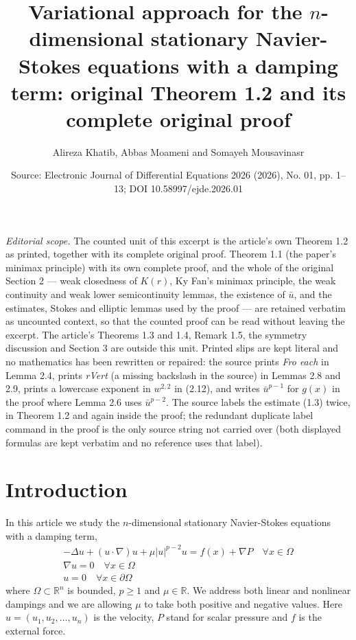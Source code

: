\documentclass[10pt,a4paper]{amsart}
\title[Stationary Navier-Stokes with nonlinear damping: original Theorem 1.2]{Variational approach for the $n$-dimensional stationary Navier-Stokes equations with a damping term: original Theorem 1.2 and its complete original proof}
\author{Alireza Khatib, Abbas Moameni and Somayeh Mousavinasr}
\date{Source: Electronic Journal of Differential Equations 2026 (2026), No. 01, pp. 1--13; DOI 10.58997/ejde.2026.01}
\numberwithin{equation}{section}
\begin{document}
\maketitle
\noindent\textit{Editorial scope.} The counted unit of this excerpt is the article's own Theorem 1.2 as printed, together with its complete original proof. Theorem 1.1 (the paper's minimax principle) with its own complete proof, and the whole of the original Section 2 --- weak closedness of $K(r)$, Ky Fan's minimax principle, the weak continuity and weak lower semicontinuity lemmas, the existence of $\bar u$, and the estimates, Stokes and elliptic lemmas used by the proof --- are retained verbatim as uncounted context, so that the counted proof can be read without leaving the excerpt. The article's Theorems 1.3 and 1.4, Remark 1.5, the symmetry discussion and Section 3 are outside this unit. Printed slips are kept literal and no mathematics has been rewritten or repaired: the source prints \textit{Fro each} in Lemma 2.4, prints \textit{rVert} (a missing backslash in the source) in Lemmas 2.8 and 2.9, prints a lowercase exponent in $w^{2,2}$ in (2.12), and writes $\bar u^{p-1}$ for $g(x)$ in the proof where Lemma 2.6 uses $\bar u^{p-2}$. The source labels the estimate (1.3) twice, in Theorem 1.2 and again inside the proof; the redundant duplicate label command in the proof is the only source string not carried over (both displayed formulas are kept verbatim and no reference uses that label).
\section{Introduction}

In this article we study  the $n$-dimensional  stationary Navier-Stokes equations
with a damping term,
\begin{equation}\label{eq1}
 \begin{gathered}
 -\Delta u+ (u \cdot \nabla)u  +\mu |u|^{p-2}u = f(x) + \nabla P  \quad
   \forall x\in \Omega\\
 \nabla  u=0  \quad  \forall x\in \Omega \\
  u=0  \quad   \forall x\in \partial\Omega
\end{gathered}
\end{equation}
where \(\Omega \subset \mathbb{R} ^n\) is  bounded,  $p\geq 1$ and
$\mu \in \mathbb{R}$.  We address both  linear and nonlinear dampings
and we are allowing $\mu$ to take both positive and negative values.
Here \(u  = (u_1, u_2,\dots, u_n)\) is the velocity, \(P\) stand for scalar pressure
and \(f\) is the  external force.
\end{document}
